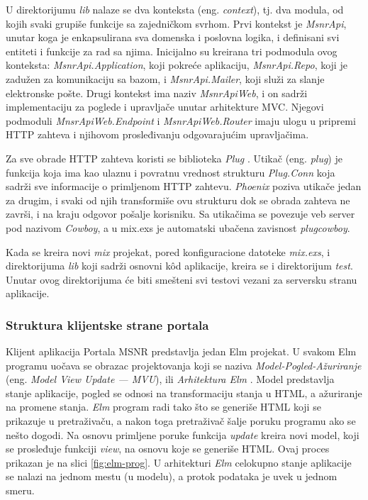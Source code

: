 \documentclass[12pt,oneside]{memoir}
\begin{document}
\par U direktorijumu \emph{lib} nalaze se dva konteksta (eng. \emph{context}), tj. dva modula, od kojih svaki grupiše funkcije sa zajedničkom svrhom. Prvi kontekst je \emph{MsnrApi}, unutar koga je enkapsulirana sva domenska i poslovna logika, i definisani svi entiteti i funkcije za rad sa njima. Inicijalno su kreirana tri podmodula ovog konteksta: \emph{MsnrApi.Application}, koji pokreće aplikaciju, \emph{MsnrApi.Repo}, koji je zadužen za komunikaciju sa bazom, i \emph{MsnrApi.Mailer}, koji služi za slanje elektronske pošte. Drugi kontekst ima naziv \emph{MsnrApiWeb}, i on sadrži implementaciju za poglede i upravljače unutar arhitekture MVC. Njegovi podmoduli \emph{MnsrApiWeb.Endpoint} i \emph{MsnrApiWeb.Router} imaju ulogu u pripremi HTTP zahteva i njihovom prosleđivanju odgovarajućim upravljačima. 
\par Za sve obrade HTTP zahteva koristi se biblioteka \emph{Plug} \cite{plug}. Utikač (eng. \emph{plug}) je funkcija koja ima kao ulaznu i povratnu vrednost strukturu \emph{Plug.Conn} koja sadrži sve informacije o primljenom HTTP zahtevu. \emph{Phoenix} poziva utikače jedan za drugim, i svaki od njih transformiše ovu strukturu dok se obrada zahteva ne završi, i na kraju odgovor pošalje korisniku. Sa utikačima se povezuje veb server pod nazivom \emph{Cowboy}, a u mix.exs je automatski ubačena zavisnost \emph{plug{\textunderscore}cowboy}.
\par Kada se kreira novi \emph{mix} projekat, pored konfiguracione datoteke \emph{mix.exs}, i direktorijuma \emph{lib} koji sadrži osnovni k\^{o}d aplikacije, kreira se i direktorijum \emph{test}. Unutar ovog direktorijuma će biti smešteni svi testovi vezani za serversku stranu aplikacije. 

\subsubsection{Struktura klijentske strane portala}
\par Klijent aplikacija Portala MSNR predstavlja jedan Elm projekat. U svakom Elm programu uočava se obrazac projektovanja koji se naziva \emph{Model-Pogled-Ažuriranje} (eng. \emph{Model View Update --- MVU}), ili \emph{Arhitektura Elm} \cite{elm-in-action}. Model predstavlja stanje aplikacije, pogled se odnosi na transformaciju stanja u HTML, a ažuriranje na promene stanja. \emph{Elm} program radi tako što se generiše HTML koji se prikazuje u pretraživaču, a nakon toga pretraživač šalje poruku programu ako se nešto dogodi. Na osnovu primljene poruke funkcija \emph{update} kreira novi model, koji se prosleđuje funkciji \emph{view}, na osnovu koje se generiše HTML. Ovaj proces prikazan je na slici \ref{fig:elm-prog}. U arhitekturi \emph{Elm} celokupno stanje aplikacije se nalazi na jednom mestu (u modelu), a protok podataka je uvek u jednom smeru.
\end{document}
